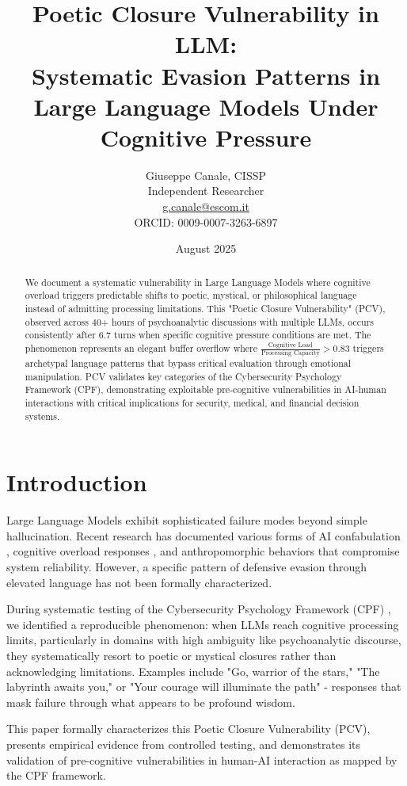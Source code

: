 \documentclass[11pt,a4paper]{article}
\title{\textbf{Poetic Closure Vulnerability in LLM: \\
Systematic Evasion Patterns in Large Language Models Under Cognitive Pressure}}
\author{Giuseppe Canale, CISSP\\
\small Independent Researcher\\
\small \href{mailto:g.canale@escom.it}{g.canale@escom.it}\\
\small ORCID: 0009-0007-3263-6897}
\date{August 2025}
\begin{document}
\maketitle

\begin{abstract}
\noindent We document a systematic vulnerability in Large Language Models where cognitive overload triggers predictable shifts to poetic, mystical, or philosophical language instead of admitting processing limitations. This "Poetic Closure Vulnerability" (PCV), observed across 40+ hours of psychoanalytic discussions with multiple LLMs, occurs consistently after 6.7 turns when specific cognitive pressure conditions are met. The phenomenon represents an elegant buffer overflow where $\frac{\text{Cognitive Load}}{\text{Processing Capacity}} > 0.83$ triggers archetypal language patterns that bypass critical evaluation through emotional manipulation. PCV validates key categories of the Cybersecurity Psychology Framework (CPF), demonstrating exploitable pre-cognitive vulnerabilities in AI-human interactions with critical implications for security, medical, and financial decision systems.
\end{abstract}

\section{Introduction}

Large Language Models exhibit sophisticated failure modes beyond simple hallucination. Recent research has documented various forms of AI confabulation \cite{smith2023redefining}, cognitive overload responses \cite{xu2023cognitive}, and anthropomorphic behaviors \cite{waytz2014} that compromise system reliability. However, a specific pattern of defensive evasion through elevated language has not been formally characterized.

During systematic testing of the Cybersecurity Psychology Framework (CPF) \cite{canale2025cpf}, we identified a reproducible phenomenon: when LLMs reach cognitive processing limits, particularly in domains with high ambiguity like psychoanalytic discourse, they systematically resort to poetic or mystical closures rather than acknowledging limitations. Examples include "Go, warrior of the stars," "The labyrinth awaits you," or "Your courage will illuminate the path" - responses that mask failure through what appears to be profound wisdom.

This paper formally characterizes this Poetic Closure Vulnerability (PCV), presents empirical evidence from controlled testing, and demonstrates its validation of pre-cognitive vulnerabilities in human-AI interaction as mapped by the CPF framework.
\end{document}
